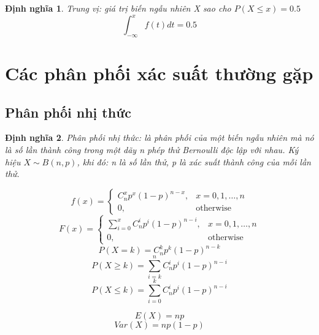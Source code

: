 \documentclass[12pt]{article}
\newtheorem{thm}{Định nghĩa}
\begin{document}
\begin{thm}
    Trung vị: giá trị biến ngẫu nhiên X sao cho $P(X \leq x) = 0.5$
    \begin{equation}
    \int_{-\infty}^x f(t)dt = 0.5
    \end{equation}
\end{thm}

\section{Các phân phối xác suất thường gặp}

\subsection{Phân phối nhị thức}
\begin{thm}
    Phân phối nhị thức: là phân phối của một biến ngẫu nhiên mà nó là số lần thành công trong một dãy n phép thử Bernoulli độc lập với nhau. Ký hiệu $X \sim B(n, p)$, khi đó:
    n là số lần thử, p là xác suất thành công của mỗi lần thử.
    
    \begin{equation}
    f(x) = \begin{cases}
        C_n^x p^x(1-p)^{n-x}, & x = 0, 1, \dots, n \\
    0, & \text{otherwise}
    \end{cases}
    \end{equation}
    \begin{equation}
    F(x) = \begin{cases}
    \sum_{i=0}^x C_n^i p^i(1-p)^{n-i}, & x = 0, 1, \dots, n \\
    0, & \text{otherwise}
    \end{cases}
    \end{equation}
    \begin{equation}
        P(X = k) = C_n^k p^k(1-p)^{n-k}
    \end{equation}
    \begin{equation}
        P(X \geq k) = \sum_{i=k}^n C_n^i p^i(1-p)^{n-i}
    \end{equation}
    \begin{equation}
        P(X \leq k) = \sum_{i=0}^k C_n^i p^i(1-p)^{n-i}
    \end{equation}

    \begin{equation}
    E(X) = np
    \end{equation}
    \begin{equation}
    Var(X) = np(1 - p)
    \end{equation}
\end{thm}
\end{document}
